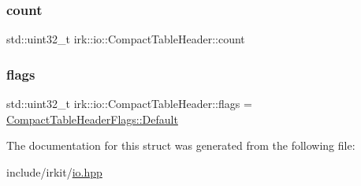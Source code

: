 \subsubsection{\texorpdfstring{count}{count}}
{\footnotesize\ttfamily std\+::uint32\+\_\+t irk\+::io\+::\+Compact\+Table\+Header\+::count}

\mbox{\label{structirk_1_1io_1_1CompactTableHeader_adf1bf79e83996183cb56f7a6a02c2b95}} 
\subsubsection{\texorpdfstring{flags}{flags}}
{\footnotesize\ttfamily std\+::uint32\+\_\+t irk\+::io\+::\+Compact\+Table\+Header\+::flags = \mbox{\hyperlink{structirk_1_1io_1_1CompactTableHeaderFlags_aba694dc8cc99ef6b087c102f484ea852}{Compact\+Table\+Header\+Flags\+::\+Default}}}



The documentation for this struct was generated from the following file\+:\begin{DoxyCompactItemize}
\item 
include/irkit/\mbox{\hyperlink{io_8hpp}{io.\+hpp}}\end{DoxyCompactItemize}

